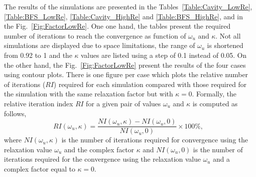 \documentclass[final,3p,times,11pt,onecolumn]{myElsarticle}
\numberwithin{equation}{section}
\begin{document}
The results of the simulations are presented in the Tables~\ref{Table:Cavity_LowRe}, \ref{Table:BFS_LowRe}, \ref{Table:Cavity_HighRe} and \ref{Table:BFS_HighRe}, and in the Fig.~\ref{Fig:FactorLowRe}. One one hand, the tables present the required number of iterations to reach the convergence as function of $\omega_u$ and $\kappa$. Not all simulations are displayed due to space limitations, the range of $\omega_u$ is shortened from 0.92 to 1 and the $\kappa$ values are listed using a step of 0.1 instead of 0.05. On the other hand, the Fig.~\ref{Fig:FactorLowRe} present the results of the four cases using contour plots. There is one figure per case which plots the relative number of iterations ($RI$) required for each simulation compared with those required for the simulation with the same relaxation factor but with $\kappa = 0$. Formally, the relative iteration index $RI$ for a given pair of values $\omega_u$ and $\kappa$ is computed as follows,
\begin{equation}
\label{Eq:relativeIndex}
RI(\omega_u, \kappa)
=
\dfrac
{
NI(\omega_u, \kappa) - NI(\omega_u, 0)
}
{
NI(\omega_u, 0)
}
\times
100 \%,
\end{equation}
where $NI(\omega_u, \kappa)$ is the number of iterations required for convergence using the relaxation value $\omega_u$ and the complex factor $\kappa$ and $NI(\omega_u, 0)$ is the number of iterations required for the convergence using the relaxation value $\omega_u$ and a complex factor equal to $\kappa = 0$.
\end{document}
